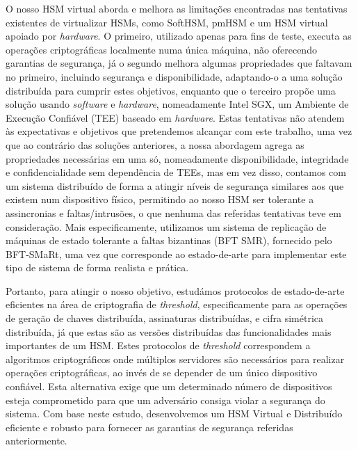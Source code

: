 O nosso HSM virtual aborda e melhora as limitações encontradas nas tentativas existentes de virtualizar HSMs, como SoftHSM, pmHSM e um HSM virtual apoiado por \textit{hardware}. O primeiro, utilizado apenas para fins de teste, executa as operações criptográficas localmente numa única máquina, não oferecendo garantias de segurança, já o segundo melhora algumas propriedades que faltavam no primeiro, incluindo segurança e disponibilidade, adaptando-o a uma solução distribuída para cumprir estes objetivos, enquanto que o terceiro propõe uma solução usando \textit{software} e \textit{hardware}, nomeadamente Intel SGX, um Ambiente de Execução Confiável (TEE) baseado em \textit{hardware}. Estas tentativas não atendem às expectativas e objetivos que pretendemos alcançar com este trabalho, uma vez que ao contrário das soluções anteriores, a nossa abordagem agrega as propriedades necessárias em uma só, nomeadamente disponibilidade, integridade e confidencialidade sem dependência de TEEs, mas em vez disso, contamos com um sistema distribuído de forma a atingir níveis de segurança similares aos que existem num dispositivo físico, permitindo ao nosso HSM ser tolerante a assincronias e faltas/intrusões, o que nenhuma das referidas tentativas teve em consideração. Mais especificamente, utilizamos um sistema de replicação de máquinas de estado tolerante a faltas bizantinas (BFT SMR), fornecido pelo BFT-SMaRt, uma vez que corresponde ao estado-de-arte para implementar este tipo de sistema de forma realista e prática.

Portanto, para atingir o nosso objetivo, estudámos protocolos de estado-de-arte eficientes na área de criptografia de \textit{threshold}, especificamente para as operações de geração de chaves distribuída, assinaturas distribuídas, e cifra simétrica distribuída, já que estas são as versões distribuídas das funcionalidades mais importantes de um HSM. Estes protocolos de \textit{threshold} correspondem a algoritmos criptográficos onde múltiplos servidores são necessários para realizar operações criptográficas, ao invés de se depender de um único dispositivo confiável. Esta alternativa exige que um determinado número de dispositivos esteja comprometido para que um adversário consiga violar a segurança do sistema. Com base neste estudo, desenvolvemos um HSM Virtual e Distribuído eficiente e robusto para fornecer as garantias de segurança referidas anteriormente.

